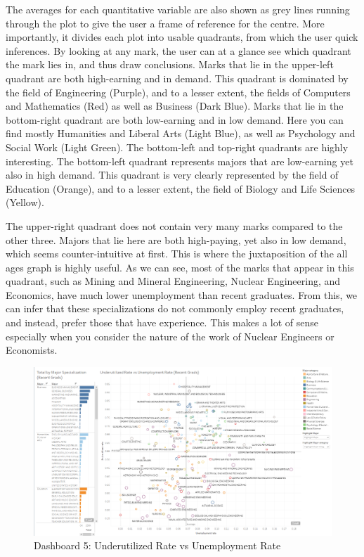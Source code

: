 \documentclass[sigchi]{acmart}
\begin{document}
The averages for each quantitative variable are also shown as grey lines running through the plot to give the user a frame of reference for the centre. More importantly, it divides each plot into usable quadrants, from which the user quick inferences. By looking at any mark, the user can at a glance see which quadrant the mark lies in, and thus draw conclusions. Marks that lie in the upper-left quadrant are both high-earning and in demand. This quadrant is dominated by the field of Engineering (Purple), and to a lesser extent, the fields of Computers and Mathematics (Red) as well as Business (Dark Blue). Marks that lie in the bottom-right quadrant are both low-earning and in low demand. Here you can find mostly Humanities and Liberal Arts (Light Blue), as well as Psychology and Social Work (Light Green). The bottom-left and top-right quadrants are highly interesting. The bottom-left quadrant represents majors that are low-earning yet also in high demand. This quadrant is very clearly represented by the field of Education (Orange), and to a lesser extent, the field of Biology and Life Sciences (Yellow). 

The upper-right quadrant does not contain very many marks compared to the other three. Majors that lie here are both high-paying, yet also in low demand, which seems counter-intuitive at first. This is where the juxtaposition of the all ages graph is highly useful. As we can see, most of the marks that appear in this quadrant, such as Mining and Mineral Engineering, Nuclear Engineering, and Economics, have much lower unemployment than recent graduates. From this, we can infer that these specializations do not commonly employ recent graduates, and instead, prefer those that have experience. This makes a lot of sense especially when you consider the nature of the work of Nuclear Engineers or Economists.

  \begin{figure}[thpb]
  \includegraphics[width=1.0\textwidth]{DB5.png}
     \caption{Dashboard 5: Underutilized Rate vs Unemployment Rate}
         \label{fig:db5}
  \end{figure}
\end{document}
